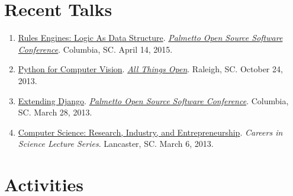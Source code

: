 \documentclass[10pt]{article}
\begin{document}
\vspace{-1.5em}

\skillsLegend


\let\originalbibitem\bibitem
\def\bibitem#1#2\par{%
  \noexpandarg
  \originalbibitem{#1}
  \par}

\nocite{derrick:16}
\nocite{waggoner:15}
\nocite{waggoner:phd}
\nocite{waggoner:14}
\nocite{waggoner:13a}
\nocite{barbu:12}
\nocite{zhang:12}
\nocite{waggoner:11}
\nocite{temlyakov:10}
\nocite{zhang:10}

\renewcommand\refname{Selected Publications}
{\footnotesize }


\section{Recent Talks}
{\footnotesize
\begin{enumerate}[align=left,labelsep=0em]
\renewcommand{\labelenumi}{[\arabic{enumi}]}
\item \href{http://www.malloc47.com/posscon2015/}{Rules Engines: Logic As Data Structure}. \emph{\href{http://posscon.org/}{Palmetto Open Source Software Conference}}. Columbia, SC. April 14, 2015.
\item \href{http://www.malloc47.com/ato2013/}{Python for Computer Vision}. \emph{\href{http://allthingsopen.org/}{All Things Open}}. Raleigh, SC. October 24, 2013.
\item \href{http://www.malloc47.com/posscon2013/}{Extending Django}. \emph{\href{http://posscon.org/}{Palmetto Open Source Software Conference}}.  Columbia, SC.  March 28, 2013.
\item \href{http://www.malloc47.com/cs-careers/}{Computer Science: Research, Industry, and Entrepreneurship}.  \emph{Careers in Science Lecture Series}.  Lancaster, SC.  March 6, 2013.
\end{enumerate}}

\section{Activities}
\activities

\footer

\pagestyle{myheadings}

\end{document}
